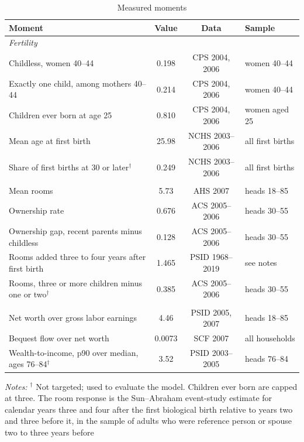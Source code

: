 \begin{table}[t]
\centering
\caption{Measured moments}
\label{tab:emp-targets}
\small
\begin{tabularx}{\linewidth}{Xccl}
\toprule
Moment & Value & Data & Sample \\
\midrule
\multicolumn{4}{l}{\emph{Fertility}}\\
Childless, women 40--44 & 0.198 & CPS 2004, 2006 & women 40--44 \\
Exactly one child, among mothers 40--44 & 0.214 & CPS 2004, 2006 & women 40--44 \\
Children ever born at age 25 & 0.810 & CPS 2004, 2006 & women aged 25 \\
Mean age at first birth & 25.98 & NCHS 2003--2006 & all first births \\
Share of first births at 30 or later$^{\dagger}$ & 0.249 & NCHS 2003--2006 & all first births \\
\addlinespace
\multicolumn{4}{l}{\emph{Housing}}\\
Mean rooms & 5.73 & AHS 2007 & heads 18--85 \\
Ownership rate & 0.676 & ACS 2005--2006 & heads 30--55 \\
Ownership gap, recent parents minus childless & 0.128 & ACS 2005--2006 & heads 30--55 \\
Rooms added three to four years after first birth & 1.465 & PSID 1968--2019 & see notes \\
Rooms, three or more children minus one or two$^{\dagger}$ & 0.385 & ACS 2005--2006 & heads 30--55 \\
\addlinespace
\multicolumn{4}{l}{\emph{Wealth}}\\
Net worth over gross labor earnings & 4.46 & PSID 2005, 2007 & heads 18--85 \\
Bequest flow over net worth & 0.0073 & SCF 2007 & all households \\
Wealth-to-income, p90 over median, ages 76--84$^{\dagger}$ & 3.52 & PSID 2003--2005 & heads 76--84 \\
\bottomrule
\end{tabularx}
\par\smallskip
\begin{minipage}{0.95\linewidth}
\footnotesize\textit{Notes:} $^{\dagger}$ Not targeted; used to evaluate the
model. Children ever born are capped at three. The room response is the
Sun--Abraham event-study estimate for calendar years three and four after the
first biological birth relative to years two and three before it, in the
sample of adults who were reference person or spouse two to three years before

\end{minipage}
\end{table}
